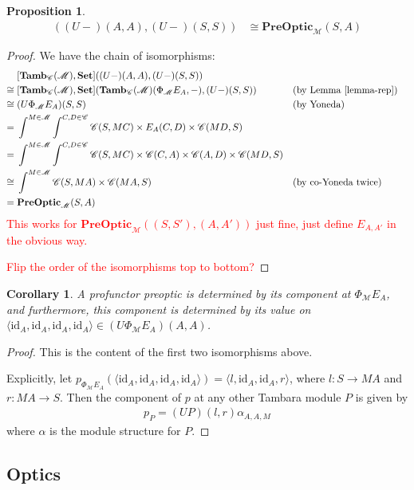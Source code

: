 \documentclass[11pt,a4paper]{article}
\theoremstyle{plain}
\newtheorem{proposition}[theorem]{Proposition}
\newtheorem{corollary}[theorem]{Corollary}
\theoremstyle{definition}
\newcommand{\C}{\mathscr{C}}
\newcommand{\M}{\mathscr{M}}
\newcommand{\Pastro}{\Phi}
\newcommand{\Set}{\mathbf{Set}}
\newcommand{\PreOptic}{\mathbf{PreOptic}}
\newcommand{\Tamb}{\mathbf{Tamb}}
\newcommand{\id}{\mathrm{id}}
\newcommand{\todo}[1]{\textcolor{red}{\small #1}}
\begin{document}
\begin{proposition}
\label{prop-profunctor-optics-are-optics}
\begin{align*}
[\Tamb_\C(\M), \Set]((U-)(A,A),(U-)(S,S)) &\cong \PreOptic_\M(S, A)
\end{align*}
\end{proposition}
\begin{proof}
We have the chain of isomorphisms:
\begin{align*}
&[\Tamb_\C(\M), \Set]((U-)(A,A),(U-)(S,S)) \\
\cong \;&[\Tamb_\C(\M), \Set](\Tamb_\C(\M)(\Pastro_\M E_A, -), (U-)(S,S))  && \text{(by Lemma \ref{lemma-rep})}\\
\cong \;&(U\Pastro_\M E_A)(S,S)  && \text{(by Yoneda)} \\
= \;&\int^{M \in \M} \int^{C,D \in \C} \C(S, MC) \times E_A(C,D) \times \C(MD,S) \\
= \;&\int^{M \in \M} \int^{C,D \in \C} \C(S, MC) \times \C(C,A) \times \C(A,D) \times \C(MD,S) \\
\cong \;&\int^{M \in \M} \C(S, MA) \times \C(MA, S)  && \text{(by co-Yoneda twice)} \\
= \;&\PreOptic_\M(S, A)
\end{align*}
\todo{This works for $\PreOptic_\M((S, S'), (A, A'))$ just fine, just define $E_{A,A'}$ in the obvious way.}

\todo{Flip the order of the isomorphisms top to bottom?}
\end{proof}

\begin{corollary}
A profunctor preoptic is determined by its component at $\Pastro_\M E_A$, and furthermore, this component is determined by its value on $\langle \id_A, \id_A, \id_A, \id_A \rangle \in (U \Pastro_\M E_A)(A, A)$.
\end{corollary}
\begin{proof}
This is the content of the first two isomorphisms above.

Explicitly, let $p_{\Pastro_\M E_A}(\langle \id_A, \id_A, \id_A, \id_A \rangle) = \langle l, \id_A, \id_A, r \rangle$, where $l : S \to M A$ and $r : M A \to S$. Then the component of $p$ at any other Tambara module $P$ is given by
\begin{align*}
p_P = (UP)(l,r) \alpha_{A,A,M}
\end{align*}
where $\alpha$ is the module structure for $P$.
\end{proof}

\subsection{Optics}
\end{document}
